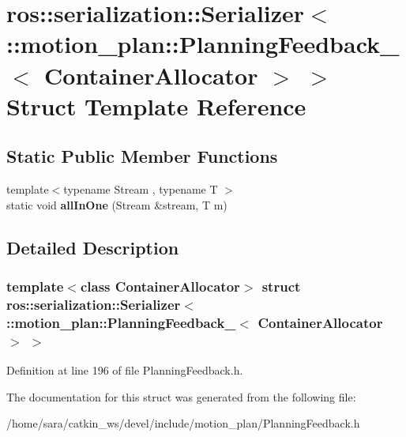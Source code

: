 \hypertarget{structros_1_1serialization_1_1Serializer_3_01_1_1motion__plan_1_1PlanningFeedback___3_01ContainerAllocator_01_4_01_4}{}\section{ros\+:\+:serialization\+:\+:Serializer$<$ \+:\+:motion\+\_\+plan\+:\+:Planning\+Feedback\+\_\+$<$ Container\+Allocator $>$ $>$ Struct Template Reference}
\label{structros_1_1serialization_1_1Serializer_3_01_1_1motion__plan_1_1PlanningFeedback___3_01ContainerAllocator_01_4_01_4}
\subsection*{Static Public Member Functions}
\begin{DoxyCompactItemize}
\item 
\mbox{\label{structros_1_1serialization_1_1Serializer_3_01_1_1motion__plan_1_1PlanningFeedback___3_01ContainerAllocator_01_4_01_4_aca2a47df74e00e500e21c73910eb3650}} 
{\footnotesize template$<$typename Stream , typename T $>$ }\\static void {\bfseries all\+In\+One} (Stream \&stream, T m)
\end{DoxyCompactItemize}


\subsection{Detailed Description}
\subsubsection*{template$<$class Container\+Allocator$>$\newline
struct ros\+::serialization\+::\+Serializer$<$ \+::motion\+\_\+plan\+::\+Planning\+Feedback\+\_\+$<$ Container\+Allocator $>$ $>$}



Definition at line 196 of file Planning\+Feedback.\+h.



The documentation for this struct was generated from the following file\+:\begin{DoxyCompactItemize}
\item 
/home/sara/catkin\+\_\+ws/devel/include/motion\+\_\+plan/Planning\+Feedback.\+h\end{DoxyCompactItemize}
